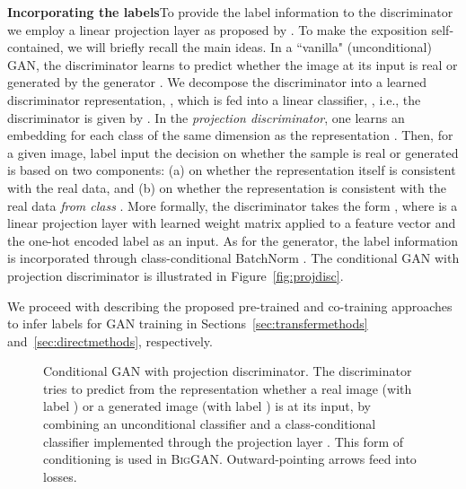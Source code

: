 \documentclass{article}
\newcommand{\biggan}{\textsc{BigGAN}}
\begin{document}
\textbf{Incorporating the labels}\quad To provide the label information to the discriminator we employ a linear projection layer as proposed by \citet{miyato2018cgans}. To make the exposition self-contained, we will briefly recall the main ideas. In a ``vanilla" (unconditional) GAN, the discriminator  learns to predict whether the image  at its input is real or generated by the generator . We decompose the discriminator into a learned discriminator representation, , which is fed into a linear classifier, , i.e., the discriminator is given by . In the \emph{projection discriminator}, one learns an embedding for each class of the same dimension as the representation . Then, for a given image, label input  the decision on whether the sample is real or generated is based on two components: (a) on whether the representation  itself is consistent with the real data, and (b) on whether the representation  is consistent with the real data \emph{from class }. More formally, the discriminator takes the form , where 
 is a linear projection layer with learned weight matrix  applied to a feature vector  and the one-hot encoded label  as an input. 
As for the generator, the label information  is incorporated through class-conditional BatchNorm \cite{dumoulin2017learned, de2017modulating}. The conditional GAN with projection discriminator is illustrated in Figure~\ref{fig:projdisc}.

We proceed with describing the proposed pre-trained and co-training approaches to infer labels for GAN training in Sections~\ref{sec:transfermethods} and~\ref{sec:directmethods}, respectively.

\newcommand{\sw}{0.35\textwidth}
\newcommand{\deflabels}{
\node[] at (0.22, 0.73) {};
 \node[] at (-0.01, 0.8) {};
 \node[] at (0, 0.67) {};
 \node[] at (0.67, 0.48) {};
 \node[] at (0.48, 0.85) {};
 \node[] at (0.36, 0.12) {};
 \node[] at (0.97, 0.21) {};
 \node[] at (0.885, 0.54) {\footnotesize};
 \node[] at (0.885, 0.42) {\footnotesize};
}

\begin{figure}[t]
\centering
{}
\caption{\label{fig:projdisc}Conditional GAN with projection discriminator. The discriminator tries to predict from the representation  whether a real image  (with label ) or a generated image  (with label ) is at its input, by combining an unconditional classifier  and a class-conditional classifier implemented through the projection layer . This form of conditioning is used in \biggan{}. Outward-pointing arrows feed into losses. \label{fig:biggan_illustration}}
\end{figure}
\end{document}
